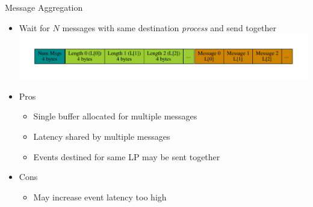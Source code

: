 \documentclass[10pt]{beamer}
\begin{document}
\begin{frame}{Message Aggregation}
    \begin{itemize}
        \item Wait for $N$ messages with same destination \emph{process} and send together
        \includegraphics[width=\textwidth]{../figs/graphviz/aggregation_format.pdf}
        \item Pros
            \begin{itemize}
                \item Single buffer allocated for multiple messages
                \item Latency shared by multiple messages
                \item Events destined for same LP may be sent together
            \end{itemize}
        \item Cons
            \begin{itemize}
                \item May increase event latency too high
            \end{itemize}
    \end{itemize}
\end{frame}
\end{document}
